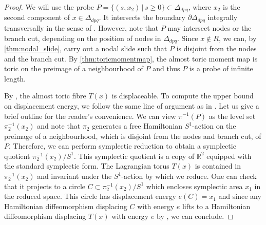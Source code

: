 \documentclass[12pt,a4paper,draft]{scrartcl}
\begin{document}
\begin{proof}
We will use the probe $P = \{(s,x_2) \, \vert \, s ≥ 0\} \subset \Delta_{dpq}$, where $x_2$ is the second component of $x \in \Delta_{dpq}$.
It intersects the boundary $∂ \Delta_{dpq}$ integrally transversally in the sense of \cite[Section 2.1]{mcduff2011displacing}.
However, note that $P$ may intersect nodes or the branch cut, depending on the position of nodes in $\Delta_{dpq}$.
Since $x ∉ R$, we can, by \cref{thm:nodal_slide}, carry out a nodal slide such that $P$ is disjoint from the nodes and the branch cut.
By \cref{thm:toricmomentmap}, the almost toric moment map is toric on the preimage of a neighbourhood of $P$ and thus $P$ is a probe of infinite length.

By \cite[Lemma 2.4]{mcduff2011displacing}, the almost toric fibre $T(x)$ is displaceable.
To compute the upper bound on displacement energy, we follow the same line of argument as in \cite[Proposition 3.4]{brendel2020real}.
Let us give a brief outline for the reader's convenience.
We can view $\pi^{-1}(P)$ as the level set $\pi_2^{-1}(x_2)$ and note that $\pi_2$ generates a free Hamiltonian $S^1$-action on the preimage of a neighbourhood, which is disjoint from the nodes and branch cut, of $P$.
Therefore, we can perform symplectic reduction to obtain a symplectic quotient $\pi_2^{-1}(x_2)/S^1$.
This symplectic quotient is a copy of $\mathbb{R}^2$ equipped with the standard symplectic form.
The Lagrangian torus $T(x)$ is contained in $\pi_2^{-1}(x_2)$ and invariant under the $S^1$-action by which we reduce.
One can check that it projects to a circle $C \subset \pi_2^{-1}(x_2)/S^1$ which encloses symplectic area $x_1$ in the reduced space.
This circle has displacement energy $e(C) = x_1$ and since any Hamiltonian diffeomorphism displacing $C$ with energy $e$ lifts to a Hamiltonian diffeomorphism displacing $T(x)$ with energy $e$ by \cite[Lemma 3.1]{brendel2020real}, we can conclude.
\end{proof}
\end{document}
